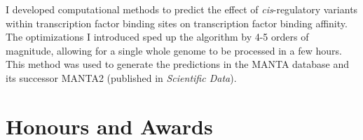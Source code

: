 \documentclass[11pt,a4paper,sans]{moderncv}        %
\begin{document}
\begin{itemize}
{\vspace{3pt}

\small{I developed computational methods to predict the effect of \emph{cis}-regulatory variants within transcription factor binding sites on transcription factor binding affinity. The optimizations I introduced sped up the algorithm by 4-5 orders of magnitude, allowing for a single whole genome to be processed in a few hours. This method was used to generate the predictions in the MANTA database and its successor MANTA2 (published in \emph{Scientific Data}).}}


\end{itemize}

\section{Honours and Awards}
\end{document}
